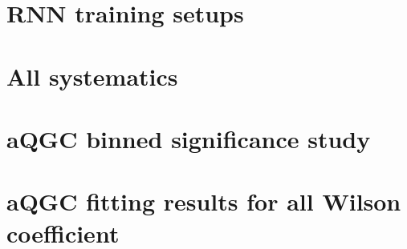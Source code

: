 
%

\clearpage
\section{RNN training setups}
\label{app:RNNsetup}


\clearpage
\section{All systematics}
\label{app:allsyst}


%

\clearpage
\section{aQGC binned significance study}
\label{app:binnedsig}

\clearpage
\section{aQGC fitting results for all Wilson coefficient}
\label{app:aQGCresults}

